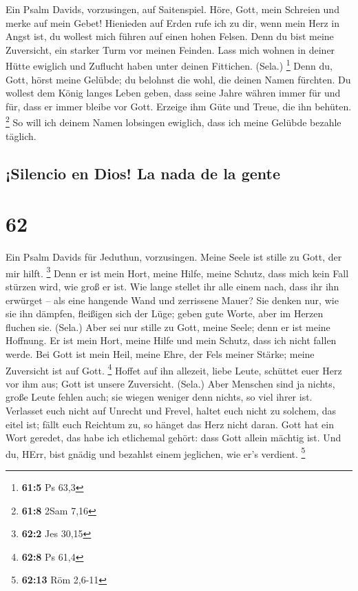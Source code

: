  Ein Psalm Davids, vorzusingen, auf Saitenspiel.
 Höre, Gott, mein Schreien und merke auf mein Gebet!
 Hienieden auf Erden rufe ich zu dir, wenn mein Herz in
Angst ist, du wollest mich führen auf einen hohen Felsen. 
Denn du bist meine Zuversicht, ein starker Turm vor meinen Feinden.
 Lass mich wohnen in deiner Hütte ewiglich und Zuflucht
haben unter deinen Fittichen. (Sela.) \footnote{\textbf{61:5} Ps 63,3}
 Denn du, Gott, hörst meine Gelübde; du belohnst die wohl,
die deinen Namen fürchten.  Du wollest dem König langes
Leben geben, dass seine Jahre währen immer für und für, 
dass er immer bleibe vor Gott. Erzeige ihm Güte und Treue, die ihn
behüten. \footnote{\textbf{61:8} 2Sam 7,16}  So will ich
deinem Namen lobsingen ewiglich, dass ich meine Gelübde bezahle täglich.

\hypertarget{silencio-en-dios-la-nada-de-la-gente}{%
\subsection{¡Silencio en Dios! La nada de la
gente}\label{silencio-en-dios-la-nada-de-la-gente}}

\hypertarget{section-61}{%
\section{62}\label{section-61}}

 Ein Psalm Davids für Jeduthun, vorzusingen.
 Meine Seele ist stille zu Gott, der mir hilft.
\footnote{\textbf{62:2} Jes 30,15}  Denn er ist mein Hort,
meine Hilfe, meine Schutz, dass mich kein Fall stürzen wird, wie groß er
ist.  Wie lange stellet ihr alle einem nach, dass ihr ihn
erwürget -- als eine hangende Wand und zerrissene Mauer? 
Sie denken nur, wie sie ihn dämpfen, fleißigen sich der Lüge; geben gute
Worte, aber im Herzen fluchen sie. (Sela.)  Aber sei nur
stille zu Gott, meine Seele; denn er ist meine Hoffnung. 
Er ist mein Hort, meine Hilfe und mein Schutz, dass ich nicht fallen
werde.  Bei Gott ist mein Heil, meine Ehre, der Fels
meiner Stärke; meine Zuversicht ist auf Gott. \footnote{\textbf{62:8} Ps
  61,4}  Hoffet auf ihn allezeit, liebe Leute, schüttet
euer Herz vor ihm aus; Gott ist unsere Zuversicht. (Sela.)
 Aber Menschen sind ja nichts, große Leute fehlen auch;
sie wiegen weniger denn nichts, so viel ihrer ist. 
Verlasset euch nicht auf Unrecht und Frevel, haltet euch nicht zu
solchem, das eitel ist; fällt euch Reichtum zu, so hänget das Herz nicht
daran.  Gott hat ein Wort geredet, das habe ich
etlichemal gehört: dass Gott allein mächtig ist.  Und du,
HErr, bist gnädig und bezahlst einem jeglichen, wie er's verdient.
\footnote{\textbf{62:13} Röm 2,6-11}

